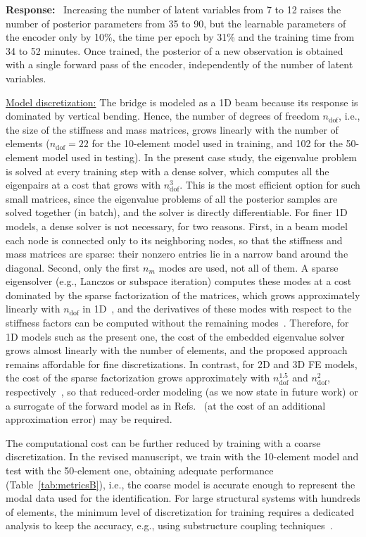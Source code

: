 \documentclass[11pt]{article}
\newenvironment{response}{\par\smallskip\noindent\color{resp}\textbf{Response:}\ }{\par}
\begin{document}
\begin{response}
Increasing the number of latent variables from 7 to 12 raises the number of posterior parameters from 35 to 90, but the learnable parameters of the encoder only by 10\%, the time per epoch by 31\% and the training time from 34 to 52 minutes. 
Once trained, the posterior of a new observation is obtained with a single forward pass of the encoder, independently of the number of latent variables.

\underline{Model discretization:}
The bridge is modeled as a 1D beam because its response is dominated by vertical bending.
Hence, the number of degrees of freedom $n_{\text{dof}}$, i.e., the size of the stiffness and mass matrices, grows linearly with the number of elements ($n_{\text{dof}}=22$ for the 10-element model used in training, and 102 for the 50-element model used in testing).
In the present case study, the eigenvalue problem is solved at every training step with a dense solver, which computes all the eigenpairs at a cost that grows with $n_{\text{dof}}^3$.
This is the most efficient option for such small matrices, since the eigenvalue problems of all the posterior samples are solved together (in batch), and the solver is directly differentiable.
For finer 1D models, a dense solver is not necessary, for two reasons. First, in a beam model each node is connected only to its neighboring nodes, so that the stiffness and mass matrices are sparse: their nonzero entries lie in a narrow band around the diagonal. Second, only the first $n_m$ modes are used, not all of them.
A sparse eigensolver (e.g., Lanczos or subspace iteration) computes these modes at a cost dominated by the sparse factorization of the matrices, which grows approximately linearly with $n_{\text{dof}}$ in 1D~\cite{george1973nested}, and the derivatives of these modes with respect to the stiffness factors can be computed without the remaining modes~\cite{nelson1976simplified}.
Therefore, for 1D models such as the present one, the cost of the embedded eigenvalue solver grows almost linearly with the number of elements, and the proposed approach remains affordable for fine discretizations.
In contrast, for 2D and 3D FE models, the cost of the sparse factorization grows approximately with $n_{\text{dof}}^{1.5}$ and $n_{\text{dof}}^{2}$, respectively~\cite{george1973nested}, so that reduced-order modeling (as we now state in future work) or a surrogate of the forward model as in Refs.~\cite{Navamuel_wes2025,Arxiv_Navamuel2026copula2d} (at the cost of an additional approximation error) may be required.

The computational cost can be further reduced by training with a coarse discretization.
In the revised manuscript, we train with the 10-element model and test with the 50-element one, obtaining adequate performance (Table~\ref{tab:metricsB}), i.e., the coarse model is accurate enough to represent the modal data used for the identification.
For large structural systems with hundreds of elements, the minimum level of discretization for training requires a dedicated analysis to keep the accuracy, e.g., using substructure coupling techniques~\cite{jensen2019sub}.
\end{response}
\end{document}
